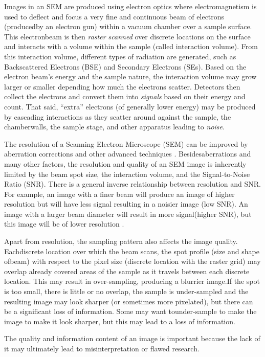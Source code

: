 \documentclass{article}
\begin{document}
Images in an SEM are produced using electron optics where electromagnetism is
used to deflect and focus a very fine and continuous beam of electrons
(producedby an electron gun) within a vacuum chamber over a sample surface. This
electronbeam is then {\it raster scanned} over discrete locations on the surface
and interacts with a volume within the sample (called interaction
volume)\cite{goldstein_image_2018}. From this interaction volume, different
types of radiation are generated, such as Backscattered Electrons (BSE) and
Secondary Electrons (SEs). Based on the electron beam’s energy and the sample
nature, the interaction volume may grow larger or smaller depending how much the
electrons scatter. Detectors then collect the electrons and convert them into
{\it signals} based on their energy and count. That said, “extra” electrons (of
generally lower energy) may be produced by cascading interactions as they
scatter around against the sample, the chamberwalls, the sample stage, and other
apparatus leading to {\it noise}.

The resolution of a Scanning Electron Microscope (SEM) can be improved by
aberration corrections and other advanced techniques \cite{joy_dc_2005}.
Besidesaberrations and many other factors, the resolution and quality of an SEM
image is inherently limited by the beam spot size, the interaction volume, and
the Signal-to-Noise Ratio (SNR). There is a general inverse relationship between
resolution and SNR. For example, an image with a finer beam will produce an
image of higher resolution but will have less signal resulting in a noisier
image (low SNR). An image with a larger beam diameter will result in more
signal(higher SNR), but this image will be of lower resolution
\cite{jeol_scanning_2013}.

Apart from resolution, the sampling pattern also affects the image quality.
Eachdiscrete location over which the beam scans, the spot profile (size and
shape ofbeam) with respect to the pixel size (discrete location with the raster
grid) may overlap already covered areas of the sample as it travels between each
discrete location. This may result in over-sampling, producing a blurrier
image.If the spot is too small, there is little or no overlap, the sample is
under-sampled and the resulting image may look sharper (or sometimes more
pixelated), but there can be a significant loss of information. Some may want
tounder-sample to make the image to make it look sharper, but this may lead to a
loss of information.

The quality and information content of an image is important because the lack of
it may ultimately lead to misinterpretation or flawed research.
\end{document}
